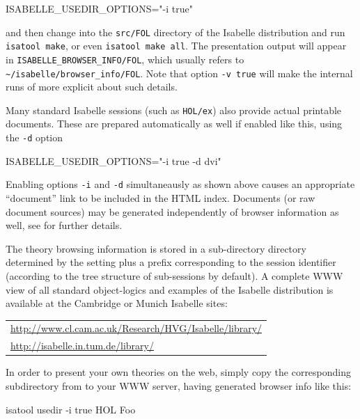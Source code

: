 \begin{isabellebody}
\begin{isamarkuptext}
\begin{ttbox}
ISABELLE_USEDIR_OPTIONS="-i true"
\end{ttbox}

  and then change into the \verb|src/FOL| directory of the
  Isabelle distribution and run \verb|isatool make|, or even
  \verb|isatool make all|.  The presentation output will appear
  in \verb|ISABELLE_BROWSER_INFO/FOL|, which usually refers to
  \verb|~/isabelle/browser_info/FOL|.  Note that option
  \verb|-v true| will make the internal runs of \hyperlink{tool.usedir}{\mbox{}}
  more explicit about such details.

  Many standard Isabelle sessions (such as \verb|HOL/ex|) also
  provide actual printable documents.  These are prepared
  automatically as well if enabled like this, using the \verb|-d| option
\begin{ttbox}
ISABELLE_USEDIR_OPTIONS="-i true -d dvi"
\end{ttbox}
  Enabling options \verb|-i| and \verb|-d|
  simultaneausly as shown above causes an appropriate ``document''
  link to be included in the HTML index.  Documents (or raw document
  sources) may be generated independently of browser information as
  well, see  for further details.

  \bigskip The theory browsing information is stored in a
  sub-directory directory determined by the \hyperlink{setting.ISABELLE-BROWSER-INFO}{\mbox{}} setting plus a prefix corresponding to the
  session identifier (according to the tree structure of sub-sessions
  by default).  A complete WWW view of all standard object-logics and
  examples of the Isabelle distribution is available at the Cambridge
  or Munich Isabelle sites:
  \begin{center}\small
  \begin{tabular}{l}
    \url{http://www.cl.cam.ac.uk/Research/HVG/Isabelle/library/} \\
    \url{http://isabelle.in.tum.de/library/} \\
  \end{tabular}
  \end{center}
  
  \medskip In order to present your own theories on the web, simply
  copy the corresponding subdirectory from \hyperlink{setting.ISABELLE-BROWSER-INFO}{\mbox{}} to your WWW server, having generated browser
  info like this:
\begin{ttbox}
isatool usedir -i true HOL Foo
\end{ttbox}


\end{isamarkuptext}
\end{isabellebody}
